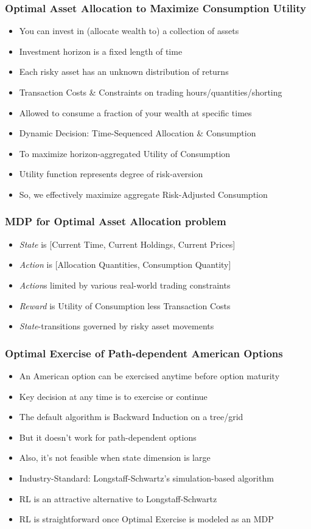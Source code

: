 \documentclass[handout]{beamer}
\begin{document}
\begin{frame}
\frametitle{Optimal Asset Allocation to Maximize Consumption Utility}
\pause
\begin{itemize}[<+->]
\item You can invest in (allocate wealth to) a collection of assets
\item Investment horizon is a fixed length of time
\item Each risky asset has an unknown distribution of returns
\item Transaction Costs \& Constraints on trading hours/quantities/shorting
\item Allowed to consume a fraction of your wealth at specific times
\item Dynamic Decision: Time-Sequenced Allocation \& Consumption
\item To maximize horizon-aggregated Utility of Consumption
\item Utility function represents degree of risk-aversion
\item So, we effectively maximize aggregate Risk-Adjusted Consumption
\end{itemize}
\end{frame}



\begin{frame}
\frametitle{MDP for Optimal Asset Allocation problem}
\pause
\begin{itemize}[<+->]
\item {\em State} is [Current Time, Current Holdings, Current Prices]
\item {\em Action} is [Allocation Quantities, Consumption Quantity]
\item {\em Action}s limited by various real-world trading constraints
\item {\em Reward} is Utility of Consumption less Transaction Costs
\item {\em State}-transitions governed by risky asset movements
\end{itemize}
\end{frame}

\begin{frame}
\frametitle{Optimal Exercise of Path-dependent American Options}
\pause
\begin{itemize}[<+->]
\item An American option can be exercised anytime before option maturity
\item Key decision at any time is to exercise or continue
\item The default algorithm is Backward Induction on a tree/grid
\item But it doesn't work for path-dependent options 
\item Also, it's not feasible when state dimension is large
\item Industry-Standard: Longstaff-Schwartz's simulation-based algorithm
\item RL is an attractive alternative to Longstaff-Schwartz
\item RL is straightforward once Optimal Exercise is modeled as an MDP
\end{itemize}
\end{frame}
\end{document}
